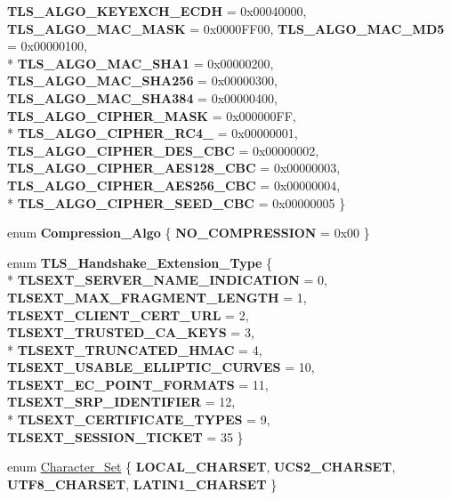 \begin{DoxyCompactItemize}
{\bfseries T\-L\-S\-\_\-\-A\-L\-G\-O\-\_\-\-K\-E\-Y\-E\-X\-C\-H\-\_\-\-E\-C\-D\-H} = 0x00040000, 
{\bfseries T\-L\-S\-\_\-\-A\-L\-G\-O\-\_\-\-M\-A\-C\-\_\-\-M\-A\-S\-K} = 0x0000\-F\-F00, 
{\bfseries T\-L\-S\-\_\-\-A\-L\-G\-O\-\_\-\-M\-A\-C\-\_\-\-M\-D5} = 0x00000100, 
\\*
{\bfseries T\-L\-S\-\_\-\-A\-L\-G\-O\-\_\-\-M\-A\-C\-\_\-\-S\-H\-A1} = 0x00000200, 
{\bfseries T\-L\-S\-\_\-\-A\-L\-G\-O\-\_\-\-M\-A\-C\-\_\-\-S\-H\-A256} = 0x00000300, 
{\bfseries T\-L\-S\-\_\-\-A\-L\-G\-O\-\_\-\-M\-A\-C\-\_\-\-S\-H\-A384} = 0x00000400, 
{\bfseries T\-L\-S\-\_\-\-A\-L\-G\-O\-\_\-\-C\-I\-P\-H\-E\-R\-\_\-\-M\-A\-S\-K} = 0x000000\-F\-F, 
\\*
{\bfseries T\-L\-S\-\_\-\-A\-L\-G\-O\-\_\-\-C\-I\-P\-H\-E\-R\-\_\-\-R\-C4\-\_} = 0x00000001, 
{\bfseries T\-L\-S\-\_\-\-A\-L\-G\-O\-\_\-\-C\-I\-P\-H\-E\-R\-\_\-D\-E\-S\-\_\-\-C\-B\-C} = 0x00000002, 
{\bfseries T\-L\-S\-\_\-\-A\-L\-G\-O\-\_\-\-C\-I\-P\-H\-E\-R\-\_\-\-A\-E\-S128\-\_\-\-C\-B\-C} = 0x00000003, 
{\bfseries T\-L\-S\-\_\-\-A\-L\-G\-O\-\_\-\-C\-I\-P\-H\-E\-R\-\_\-\-A\-E\-S256\-\_\-\-C\-B\-C} = 0x00000004, 
\\*
{\bfseries T\-L\-S\-\_\-\-A\-L\-G\-O\-\_\-\-C\-I\-P\-H\-E\-R\-\_\-\-S\-E\-E\-D\-\_\-\-C\-B\-C} = 0x00000005
 \}
\item 
enum {\bfseries Compression\-\_\-\-Algo} \{ {\bfseries N\-O\-\_\-\-C\-O\-M\-P\-R\-E\-S\-S\-I\-O\-N} = 0x00
 \}
\item 
enum {\bfseries T\-L\-S\-\_\-\-Handshake\-\_\-\-Extension\-\_\-\-Type} \{ \\*
{\bfseries T\-L\-S\-E\-X\-T\-\_\-\-S\-E\-R\-V\-E\-R\-\_\-\-N\-A\-M\-E\-\_\-\-I\-N\-D\-I\-C\-A\-T\-I\-O\-N} = 0, 
{\bfseries T\-L\-S\-E\-X\-T\-\_\-\-M\-A\-X\-\_\-\-F\-R\-A\-G\-M\-E\-N\-T\-\_\-\-L\-E\-N\-G\-T\-H} = 1, 
{\bfseries T\-L\-S\-E\-X\-T\-\_\-\-C\-L\-I\-E\-N\-T\-\_\-\-C\-E\-R\-T\-\_\-\-U\-R\-L} = 2, 
{\bfseries T\-L\-S\-E\-X\-T\-\_\-\-T\-R\-U\-S\-T\-E\-D\-\_\-\-C\-A\-\_\-\-K\-E\-Y\-S} = 3, 
\\*
{\bfseries T\-L\-S\-E\-X\-T\-\_\-\-T\-R\-U\-N\-C\-A\-T\-E\-D\-\_\-\-H\-M\-A\-C} = 4, 
{\bfseries T\-L\-S\-E\-X\-T\-\_\-\-U\-S\-A\-B\-L\-E\-\_\-\-E\-L\-L\-I\-P\-T\-I\-C\-\_\-\-C\-U\-R\-V\-E\-S} = 10, 
{\bfseries T\-L\-S\-E\-X\-T\-\_\-\-E\-C\-\_\-\-P\-O\-I\-N\-T\-\_\-\-F\-O\-R\-M\-A\-T\-S} = 11, 
{\bfseries T\-L\-S\-E\-X\-T\-\_\-\-S\-R\-P\-\_\-\-I\-D\-E\-N\-T\-I\-F\-I\-E\-R} = 12, 
\\*
{\bfseries T\-L\-S\-E\-X\-T\-\_\-\-C\-E\-R\-T\-I\-F\-I\-C\-A\-T\-E\-\_\-\-T\-Y\-P\-E\-S} = 9, 
{\bfseries T\-L\-S\-E\-X\-T\-\_\-\-S\-E\-S\-S\-I\-O\-N\-\_\-\-T\-I\-C\-K\-E\-T} = 35
 \}
\item 
enum \hyperlink{namespaceBotan_a416eb1af7496d74b885a20ff833e9b33}{Character\-\_\-\-Set} \{ {\bfseries L\-O\-C\-A\-L\-\_\-\-C\-H\-A\-R\-S\-E\-T}, 
{\bfseries U\-C\-S2\-\_\-\-C\-H\-A\-R\-S\-E\-T}, 
{\bfseries U\-T\-F8\-\_\-\-C\-H\-A\-R\-S\-E\-T}, 
{\bfseries L\-A\-T\-I\-N1\-\_\-\-C\-H\-A\-R\-S\-E\-T}
 \}
\end{DoxyCompactItemize}
